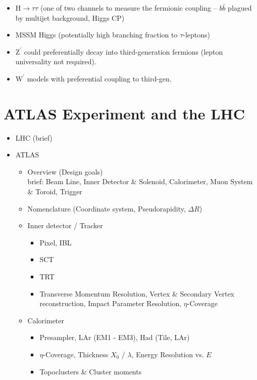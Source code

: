 \begin{itemize}
\begin{itemize}
\begin{itemize}
  \item $\mathrm{H} \rightarrow \tau \tau$ (one of two channels to measure
    the fermionic coupling -- $b \bar{b}$ plagued by multijet background,
    Higgs CP)

  \item MSSM Higgs (potentially high branching fraction to $\tau$-leptons)

  \item $\mathrm{Z}^\prime$ could preferentially decay into third-generation
    fermions (lepton universality not required).

  \item $\mathrm{W}^\prime$ models with preferential coupling to third-gen.
  \end{itemize}
\end{itemize}

\end{itemize}

\section{ATLAS Experiment and the LHC}

\begin{itemize}
\item LHC (brief)

\item ATLAS
  \begin{itemize}
  \item Overview (Design goals) \\
    brief: Beam Line, Inner Detector \& Solenoid, Calorimeter, Muon System \&
    Toroid, Trigger

  \item Nomenclature (Coordinate system, Pseudorapidity, $\Delta R$)

  \item Inner detector / Tracker
    \begin{itemize}
    \item Pixel, IBL
    \item SCT
    \item TRT
    \item  Transverse Momentum Resolution, Vertex \& Secondary Vertex
      reconstruction, Impact Parameter Resolution, $\eta$-Coverage
    \end{itemize}

  \item Calorimeter
    \begin{itemize}
    \item Presampler, LAr (EM1 - EM3), Had (Tile, LAr)
    \item $\eta$-Coverage, Thickness $X_0$ / $\lambda$, Energy Resolution
      vs. $E$
    \item Topoclusters \& Cluster moments
    \end{itemize}

  \end{itemize}
\end{itemize}

